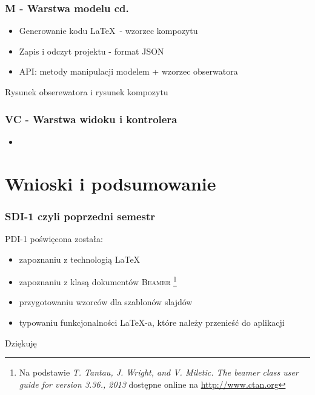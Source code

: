\documentclass[t]{beamer}
\newcommand{\beamer}{
{\rmfamily\textsc{Beamer}}
}
\begin{document}
\begin{frame}
	\frametitle{M - Warstwa modelu cd.}
	\begin{itemize}
		\item Generowanie kodu \LaTeX\ - wzorzec kompozytu
		\item Zapis i odczyt projektu - format JSON				
		\item API: metody manipulacji modelem + wzorzec obserwatora
	\end{itemize}
	\vfill Rysunek obserewatora i rysunek kompozytu
\end{frame}

\begin{frame}
	\frametitle{VC - Warstwa widoku i kontrolera}
	\begin{itemize}
		\item 
	\end{itemize}
\end{frame}


\section{Wnioski i podsumowanie}

\begin{frame}
	\frametitle{SDI-1 czyli poprzedni semestr}
		PDI-1 poświęcona została:
		\begin{itemize}
			\item zapoznaniu z technologią \LaTeX\ 
			\item zapoznaniu z klasą dokumentów \beamer\footnote{Na podstawie \emph{T. Tantau, J. Wright, and V. Miletic. The beamer class user guide for version 3.36., 2013 } dostępne online na \url{http://www.ctan.org}}
			\item przygotowaniu wzorców dla szablonów slajdów
			\item typowaniu funkcjonalności \LaTeX-a, które należy przenieść do aplikacji
		\end{itemize}
\end{frame}

\begin{frame}[c]
	\Huge Dziękuję
\end{frame}
\end{document}
